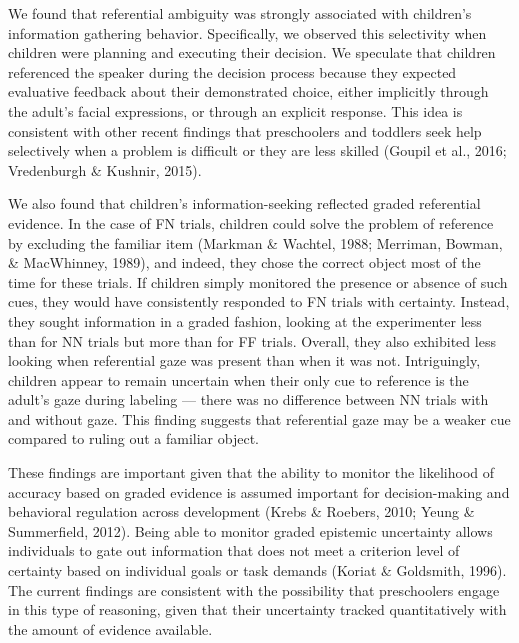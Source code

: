 \documentclass[english,man]{apa6}
\theoremstyle{definition}
\theoremstyle{definition}
\theoremstyle{definition}
\theoremstyle{remark}
\begin{document}
We found that referential ambiguity was strongly associated with
children's information gathering behavior. Specifically, we observed
this selectivity when children were planning and executing their
decision. We speculate that children referenced the speaker during the
decision process because they expected evaluative feedback about their
demonstrated choice, either implicitly through the adult's facial
expressions, or through an explicit response. This idea is consistent
with other recent findings that preschoolers and toddlers seek help
selectively when a problem is difficult or they are less skilled (Goupil
et al., 2016; Vredenburgh \& Kushnir, 2015).

We also found that children's information-seeking reflected graded
referential evidence. In the case of FN trials, children could solve the
problem of reference by excluding the familiar item (Markman \& Wachtel,
1988; Merriman, Bowman, \& MacWhinney, 1989), and indeed, they chose the
correct object most of the time for these trials. If children simply
monitored the presence or absence of such cues, they would have
consistently responded to FN trials with certainty. Instead, they sought
information in a graded fashion, looking at the experimenter less than
for NN trials but more than for FF trials. Overall, they also exhibited
less looking when referential gaze was present than when it was not.
Intriguingly, children appear to remain uncertain when their only cue to
reference is the adult's gaze during labeling --- there was no
difference between NN trials with and without gaze. This finding
suggests that referential gaze may be a weaker cue compared to ruling
out a familiar object.

These findings are important given that the ability to monitor the
likelihood of accuracy based on graded evidence is assumed important for
decision-making and behavioral regulation across development (Krebs \&
Roebers, 2010; Yeung \& Summerfield, 2012). Being able to monitor graded
epistemic uncertainty allows individuals to gate out information that
does not meet a criterion level of certainty based on individual goals
or task demands (Koriat \& Goldsmith, 1996). The current findings are
consistent with the possibility that preschoolers engage in this type of
reasoning, given that their uncertainty tracked quantitatively with the
amount of evidence available.
\end{document}
